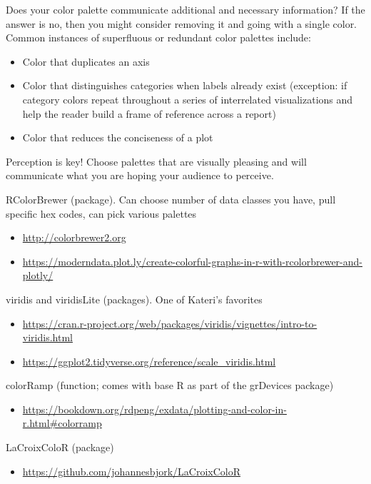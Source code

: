 \documentclass[]{article}
\providecommand{\tightlist}{%
  \setlength{\itemsep}{0pt}\setlength{\parskip}{0pt}}
\begin{document}
Does your color palette communicate additional and necessary
information? If the answer is no, then you might consider removing it
and going with a single color. Common instances of superfluous or
redundant color palettes include:

\begin{itemize}
\tightlist
\item
  Color that duplicates an axis
\item
  Color that distinguishes categories when labels already exist
  (exception: if category colors repeat throughout a series of
  interrelated visualizations and help the reader build a frame of
  reference across a report)
\item
  Color that reduces the conciseness of a plot
\end{itemize}

Perception is key! Choose palettes that are visually pleasing and will
communicate what you are hoping your audience to perceive.

RColorBrewer (package). Can choose number of data classes you have, pull
specific hex codes, can pick various palettes

\begin{itemize}
\tightlist
\item
  \url{http://colorbrewer2.org}
\item
  \url{https://moderndata.plot.ly/create-colorful-graphs-in-r-with-rcolorbrewer-and-plotly/}
\end{itemize}

viridis and viridisLite (packages). One of Kateri's favorites

\begin{itemize}
\tightlist
\item
  \url{https://cran.r-project.org/web/packages/viridis/vignettes/intro-to-viridis.html}
\item
  \url{https://ggplot2.tidyverse.org/reference/scale_viridis.html}
\end{itemize}

colorRamp (function; comes with base R as part of the grDevices package)

\begin{itemize}
\tightlist
\item
  \url{https://bookdown.org/rdpeng/exdata/plotting-and-color-in-r.html\#colorramp}
\end{itemize}

LaCroixColoR (package)

\begin{itemize}
\tightlist
\item
  \url{https://github.com/johannesbjork/LaCroixColoR}
\end{itemize}
\end{document}
